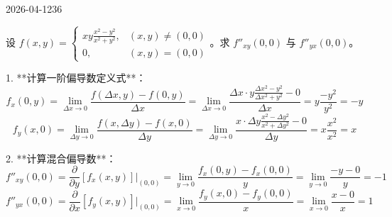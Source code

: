 \begin{mistake}{2026-04-12}{36}

\begin{problemcontent}
设 \( f(x,y)=\begin{cases} xy\frac{x^2-y^2}{x^2+y^2}, & (x,y)\neq(0,0) \\ 0, & (x,y)=(0,0) \end{cases} \)。求 \( f''_{xy}(0,0) \) 与 \( f''_{yx}(0,0) \)。
\end{problemcontent}

\begin{solutioncontent}
1. **计算一阶偏导数定义式**：
\[ f_x(0,y) = \lim_{\Delta x \to 0} \frac{f(\Delta x, y) - f(0,y)}{\Delta x} = \lim_{\Delta x \to 0} \frac{\Delta x \cdot y \frac{\Delta x^2 - y^2}{\Delta x^2 + y^2} - 0}{\Delta x} = y \frac{-y^2}{y^2} = -y \]
\[ f_y(x,0) = \lim_{\Delta y \to 0} \frac{f(x, \Delta y) - f(x,0)}{\Delta y} = \lim_{\Delta y \to 0} \frac{x \cdot \Delta y \frac{x^2 - \Delta y^2}{x^2 + \Delta y^2} - 0}{\Delta y} = x \frac{x^2}{x^2} = x \]

2. **计算混合偏导数**：
\[ f''_{xy}(0,0) = \frac{\partial}{\partial y}[f_x(x,y)]\bigg|_{(0,0)} = \lim_{y \to 0} \frac{f_x(0,y) - f_x(0,0)}{y} = \lim_{y \to 0} \frac{-y - 0}{y} = -1 \]
\[ f''_{yx}(0,0) = \frac{\partial}{\partial x}[f_y(x,y)]\bigg|_{(0,0)} = \lim_{x \to 0} \frac{f_y(x,0) - f_y(0,0)}{x} = \lim_{x \to 0} \frac{x - 0}{x} = 1 \]
\end{solutioncontent}


\end{mistake}

